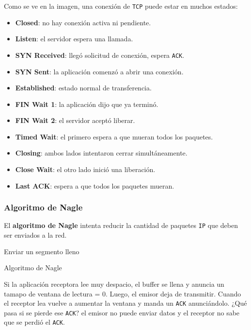 \documentclass[]{article}
\begin{document}
Como se ve en la imagen, una conexión de \texttt{TCP} puede estar en muchos estados:
\begin{itemize}
    \item \textbf{Closed}: no hay conexión activa ni pendiente.
    \item \textbf{Listen}: el servidor espera una llamada.
    \item \textbf{SYN Received}: llegó solicitud de conexión, espera \texttt{ACK}.
    \item \textbf{SYN Sent}: la aplicación comenzó a abrir una conexión.
    \item \textbf{Established}: estado normal de transferencia.
    \item \textbf{FIN Wait 1}: la aplicación dijo que ya terminó.
    \item \textbf{FIN Wait 2}: el servidor aceptó liberar.
    \item \textbf{Timed Wait}: el primero espera a que mueran todos los paquetes.
    \item \textbf{Closing}: ambos lados intentaron cerrar simultáneamente.
    \item \textbf{Close Wait}: el otro lado inició una liberación.
    \item \textbf{Last ACK}: espera a que todos los paquetes mueran.
\end{itemize}


\subsubsection{Algoritmo de Nagle}

El \textbf{algoritmo de Nagle} intenta reducir la cantidad de paquetes \texttt{IP} que deben ser enviados a la red.

\begin{algorithm}[H]
  {
    Enviar un segmento lleno
 } {
 }
 \caption{Algoritmo de Nagle}
\end{algorithm}


Si la aplicación receptora lee muy despacio, el buffer se llena y anuncia un tamapo de ventana de lectura = 0. Luego, el emisor deja de transmitir. Cuando el receptor lea vuelve a aumentar la ventana y manda un \texttt{ACK} anunciándolo. ¿Qué pasa si se pierde ese \texttt{ACK}? el emisor no puede enviar datos y el receptor no sabe que se perdió el \texttt{ACK}.
\end{document}
